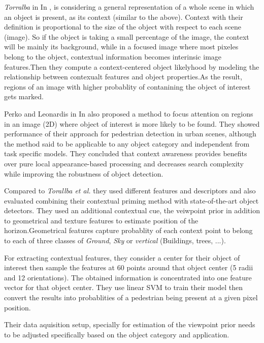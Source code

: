      
     {\it Torralba} in In \cite{TorralbaContextualPriming}, is considering a general representation of a whole scene in which an object is present, as its context (similar to the above). Context with their definition is proportional to the size of the object with respect to each scene (image). So if the object is taking a small percentage of the image, the context will be mainly its background, while in a focused image where most pixeles belong to the object, contextual information becomes interinsic image features.Then they compute a context-centered object likelyhood by modeling the relationship between contexualt features and object properties.As the result, regions of an image with higher probablity of contanining the object of interest gets marked.   
     
     Perko and Leonardis in In \cite{PerkoLeonardisContextDriven} also proposed a method to focus attention on regions in an image (2D) where object of interest is more likely to be found. They showed performance of their approach for pedestrian detection in urban scenes, although the method said to be applicable to any object category and independent from task specific models. They concluded that context awareness provides benefits over pure local appearance-based processing and decreases search complexity while improving the robustness of object detection. 
     
     Compared to \textit{Torallba et al.} they used different features and descriptors and also evaluated combining their contextual priming method with state-of-the-art object detectors. They used an additional contextual cue, the veiwpoint prior in addition to geometrical and texture features to estimate position of the horizon.Geometrical features capture probablity of each context point to belong to each of three classes of \textit{Ground}, \textit{Sky} or \textit{vertical} (Buildings, trees, ...). 
     
     For extracting contextual features, they consider a center for their object of interest then sample the features at 60 points around that object center (5 radii and 12 orientations). The obtained information is concentrated into one feature vector for that object center. They use linear SVM to train their model then convert the results into probablities of a pedestrian being present at a given pixel position. 
     
     Their data aquisition setup, specially for estimation of the viewpoint prior needs to be adjusted specifically based on the object category and application. 
     
